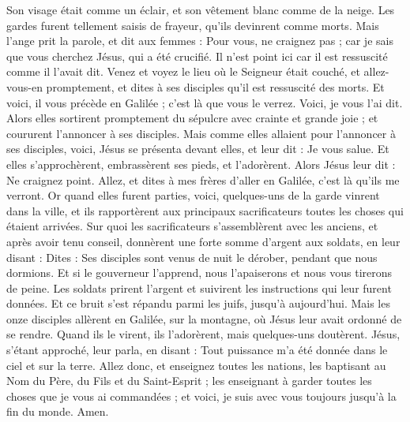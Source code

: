 \begin{multicols}{2}
Son visage était comme un éclair, et son vêtement blanc comme de la neige.
Les gardes furent tellement saisis de frayeur, qu'ils devinrent comme morts.
Mais l'ange prit la parole, et dit aux femmes : Pour vous, ne craignez pas ; car je sais que vous cherchez Jésus, qui a été crucifié.
Il n'est point ici car il est ressuscité comme il l'avait dit. Venez et voyez le lieu où le Seigneur était couché,
et allez-vous-en promptement, et dites à ses disciples qu'il est ressuscité des morts. Et voici, il vous précède en Galilée ; c'est là que vous le verrez. Voici, je vous l'ai dit.
Alors elles sortirent promptement du sépulcre avec crainte et grande joie ; et coururent l'annoncer à ses disciples.
Mais comme elles allaient pour l'annoncer à ses disciples, voici, Jésus se présenta devant elles, et leur dit : Je vous salue. Et elles s'approchèrent, embrassèrent ses pieds, et l'adorèrent.
Alors Jésus leur dit : Ne craignez point. Allez, et dites à mes frères d'aller en Galilée, c'est là qu'ils me verront.
 Or quand elles furent parties, voici, quelques-uns de la garde vinrent dans la ville, et ils rapportèrent aux principaux sacrificateurs toutes les choses qui étaient arrivées.
Sur quoi les sacrificateurs s'assemblèrent avec les anciens, et après avoir tenu conseil, donnèrent une forte somme d'argent aux soldats,
en leur disant : Dites : Ses disciples sont venus de nuit le dérober, pendant que nous dormions.
Et si le gouverneur l'apprend, nous l'apaiserons et nous vous tirerons de peine.
Les soldats prirent l'argent et suivirent les instructions qui leur furent données. Et ce bruit s'est répandu parmi les juifs, jusqu'à aujourd'hui.
Mais les onze disciples allèrent en Galilée, sur la montagne, où Jésus leur avait ordonné de se rendre.
Quand ils le virent, ils l'adorèrent, mais quelques-uns doutèrent.
Jésus, s'étant approché, leur parla, en disant : Tout puissance m'a été donnée dans le ciel et sur la terre.
Allez donc, et enseignez toutes les nations, les baptisant au Nom du Père, du Fils et du Saint-Esprit ;
les enseignant à garder toutes les choses que je vous ai commandées ; et voici, je suis avec vous toujours jusqu'à la fin du monde. Amen.
\PPE{}
\end{multicols}
